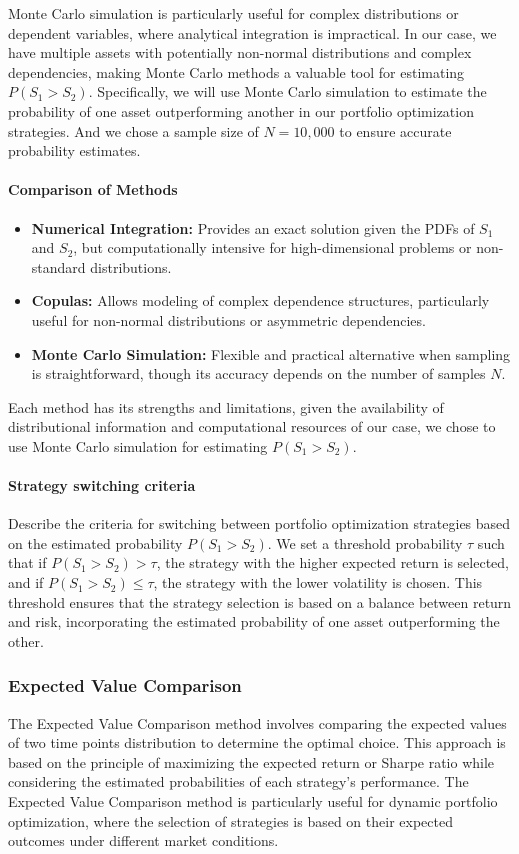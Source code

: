 Monte Carlo simulation is particularly useful for complex distributions or dependent variables, where analytical integration is impractical. In our case, we have multiple assets with potentially non-normal distributions and complex dependencies, making Monte Carlo methods a valuable tool for estimating $P(S_1 > S_2)$.
Specifically, we will use Monte Carlo simulation to estimate the probability of one asset outperforming another in our portfolio optimization strategies. And we chose a sample size of $N = 10,000$ to ensure accurate probability estimates.

\paragraph{Comparison of Methods}

\begin{itemize}
    \item \textbf{Numerical Integration:} Provides an exact solution given the PDFs of $S_1$ and $S_2$, but computationally intensive for high-dimensional problems or non-standard distributions.
    \item \textbf{Copulas:} Allows modeling of complex dependence structures, particularly useful for non-normal distributions or asymmetric dependencies.
    \item \textbf{Monte Carlo Simulation:} Flexible and practical alternative when sampling is straightforward, though its accuracy depends on the number of samples $N$.
\end{itemize}

Each method has its strengths and limitations, given the availability of distributional information and computational resources of our case, we chose to use Monte Carlo simulation for estimating $P(S_1 > S_2)$.


\paragraph{Strategy switching criteria}
Describe the criteria for switching between portfolio optimization strategies based on the estimated probability $P(S_1 > S_2)$.
We set a threshold probability $\tau$ such that if $P(S_1 > S_2) > \tau$, the strategy with the higher expected return is selected, and if $P(S_1 > S_2) \leq \tau$, the strategy with the lower volatility is chosen. This threshold ensures that the strategy selection is based on a balance between return and risk, incorporating the estimated probability of one asset outperforming the other.
\subsubsection{Expected Value Comparison}
The Expected Value Comparison method involves comparing the expected values of two time points distribution to determine the optimal choice. This approach is based on the principle of maximizing the expected return or Sharpe ratio while considering the estimated probabilities of each strategy's performance. The Expected Value Comparison method is particularly useful for dynamic portfolio optimization, where the selection of strategies is based on their expected outcomes under different market conditions.

